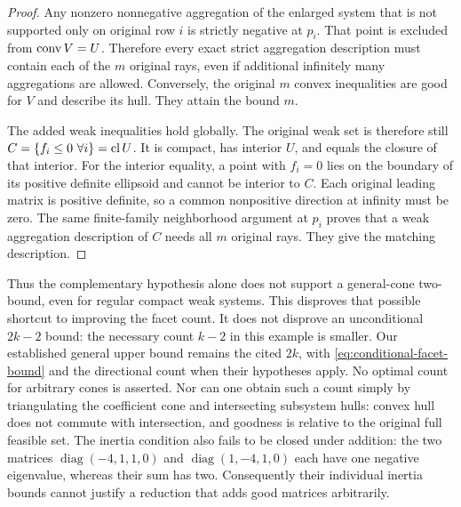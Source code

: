 \begin{proof}
Any nonzero nonnegative aggregation of the enlarged system that is
not supported only on original row $i$ is strictly negative at $p_i$.
That point is excluded from $\operatorname{conv} V=U$. Therefore every exact strict
aggregation description must contain each of the $m$ original rays,
even if additional infinitely many aggregations are allowed. Conversely,
the original $m$ convex inequalities are good for $V$ and describe
its hull. They attain the bound $m$.

The added weak inequalities hold globally. The original weak set is
therefore still $C=\{f_i\leq0\ \forall i\}=\operatorname{cl} U$.
It is compact, has interior $U$, and equals the closure of that interior.
For the interior equality, a point with $f_i=0$ lies on the boundary
of its positive definite ellipsoid and cannot be interior to $C$.
Each original leading matrix is positive definite, so a common
nonpositive direction at infinity must be zero. The same finite-family
neighborhood argument at $p_i$ proves that a weak aggregation description
of $C$ needs all $m$ original rays. They give the matching description.
\end{proof}

Thus the complementary hypothesis alone does not support a general-cone
two-bound, even for regular compact weak systems. This disproves that
possible shortcut to improving the facet count. It does not disprove an
unconditional $2k-2$ bound: the necessary count $k-2$ in this example
is smaller. Our established general upper bound remains the cited $2k$,
with \eqref{eq:conditional-facet-bound} and the directional count when
their hypotheses apply. No optimal count for arbitrary cones is asserted.
Nor can one obtain such a count simply by triangulating the coefficient
cone and intersecting subsystem hulls: convex hull does not commute with
intersection, and goodness is relative to the original full feasible set.
The inertia condition also fails to be closed under addition: the two
matrices $\operatorname{diag}(-4,1,1,0)$ and
$\operatorname{diag}(1,-4,1,0)$ each have one negative eigenvalue,
whereas their sum has two. Consequently their individual inertia bounds
cannot justify a reduction that adds good matrices arbitrarily.
